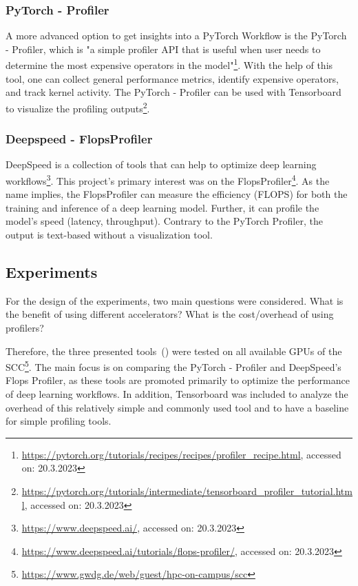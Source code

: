 \documentclass[12pt, a4paper, hidelinks]{article}
\begin{document}
\subsubsection{PyTorch - Profiler}
\label{sec:m-pytorch-profiler}

A more advanced option to get insights into a PyTorch Workflow is the PyTorch - Profiler, which is "a simple profiler API that is useful when user needs to determine the most expensive operators in the model"\footnote{\url{https://pytorch.org/tutorials/recipes/recipes/profiler_recipe.html}, accessed on: 20.3.2023}.
With the help of this tool, one can collect general performance metrics, identify expensive operators, and track kernel activity.
The PyTorch - Profiler can be used with Tensorboard to visualize the profiling outputs\footnote{\url{https://pytorch.org/tutorials/intermediate/tensorboard_profiler_tutorial.html}, accessed on: 20.3.2023}.


\subsubsection{Deepspeed - FlopsProfiler}
\label{sec:m-FLOPSprofiler}

DeepSpeed is a collection of tools that can help to optimize deep learning workflows\footnote{\url{https://www.deepspeed.ai/}, accessed on: 20.3.2023}.
This project's primary interest was on the FlopsProfiler\footnote{\url{https://www.deepspeed.ai/tutorials/flops-profiler/}, accessed on: 20.3.2023}. 
As the name implies, the FlopsProfiler can measure the efficiency (\ac{FLOPS}) for both the training and inference of a deep learning model. Further, it can profile the model's speed (latency, throughput).
Contrary to the PyTorch Profiler, the output is text-based without a visualization tool.


\subsection{Experiments}
\label{sec:m-experiments}

For the design of the experiments, two main questions were considered.
What is the benefit of using different accelerators? What is the cost/overhead of using profilers?

Therefore, the three presented tools~() were tested on all available \ac{GPU}s of the \ac{SCC}\footnote{\url{https://www.gwdg.de/web/guest/hpc-on-campus/scc}}.
The main focus is on comparing the PyTorch - Profiler and DeepSpeed's Flops Profiler, as these tools are promoted primarily to optimize the performance of deep learning workflows. In addition, Tensorboard was included to analyze the overhead of this relatively simple and commonly used tool and to have a baseline for simple profiling tools.
\end{document}
